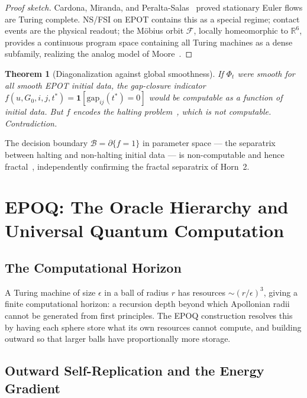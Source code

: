 \documentclass[11pt]{article}
\theoremstyle{plain}
\newtheorem{theorem}{Theorem}
\theoremstyle{definition}
\theoremstyle{remark}
\begin{document}
\begin{proof}[Proof sketch]
Cardona, Miranda, and Peralta-Salas~\cite{CMP2021} proved stationary Euler
flows are Turing complete. NS/FSI on EPOT contains this as a special regime;
contact events are the physical readout; the M\"{o}bius orbit $\mathcal{F}$,
locally homeomorphic to $\mathbb{R}^6$, provides a continuous program space
containing all Turing machines as a dense subfamily, realizing the analog
model of Moore~\cite{Moore1990}.
\end{proof}

\begin{theorem}[Diagonalization against global smoothness]
\label{thm:diag}
If $\Phi_t$ were smooth for all smooth EPOT initial data, the gap-closure
indicator $f(u,G_0,i,j,t^*) = \mathbf{1}[\mathrm{gap}_{ij}(t^*)=0]$ would
be computable as a function of initial data. But $f$ encodes the halting
problem~\cite{Turing1936}, which is not computable. Contradiction.
\end{theorem}

The decision boundary $\mathcal{B} = \partial\{f=1\}$ in parameter space
--- the separatrix between halting and non-halting initial data --- is
non-computable and hence fractal~\cite{GOY1983}, independently confirming
the fractal separatrix of Horn~2.

\section{EPOQ: The Oracle Hierarchy and Universal Quantum Computation}
\label{sec:epoq}

\subsection{The Computational Horizon}

A Turing machine of size $\epsilon$ in a ball of radius $r$ has resources
$\sim(r/\epsilon)^3$, giving a finite computational horizon: a recursion
depth beyond which Apollonian radii cannot be generated from first
principles. The EPOQ construction resolves this by having each sphere store
what its own resources cannot compute, and building outward so that larger
balls have proportionally more storage.

\subsection{Outward Self-Replication and the Energy Gradient}
\end{document}

